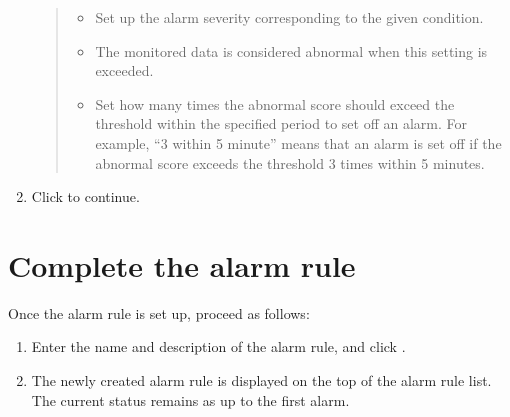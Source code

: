 \documentclass[letterpaper,10pt,english]{sphinxmanual}
\begin{document}
\begin{enumerate}
\begin{quote}
\begin{figure}[H]
\centering

\noindent{}
\end{figure}
\begin{itemize}
\item {} 
 Set up the alarm severity corresponding to the given condition.

\item {} 
 The monitored data is considered abnormal when this setting is exceeded.

\item {} 
 Set how many times the abnormal score should exceed the threshold within the specified period to set off an alarm. For example, “3 within 5 minute” means that an alarm is set off if the abnormal score exceeds the threshold 3 times within 5 minutes.

\end{itemize}
\end{quote}

\item {} 
Click  to continue.

\end{enumerate}


\section{Complete the alarm rule}
\label{\detokenize{anomaly/part02/index:complete-rule}}\label{\detokenize{anomaly/part02/index:id7}}
Once the alarm rule is set up, proceed as follows:
\begin{enumerate}
\def\theenumi{\arabic{enumi}}
\def\labelenumi{\theenumi .}
\makeatletter\def\p@enumii{\p@enumi \theenumi .}\makeatother
\item {} 
Enter the name and description of the alarm rule, and click .
\begin{quote}

\begin{figure}[H]
\centering

\noindent{}
\end{figure}
\end{quote}

\item {} 
The newly created alarm rule is displayed on the top of the alarm rule list. The current status remains as  up to the first alarm.
\begin{quote}

\begin{figure}[H]
\centering

\noindent{}
\end{figure}
\end{quote}

\end{enumerate}
\end{document}
